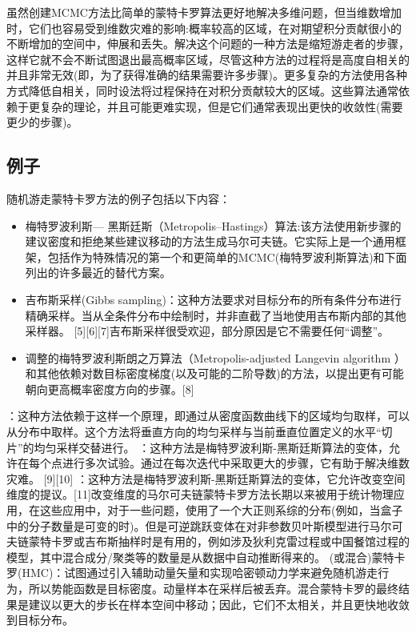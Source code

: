 虽然创建MCMC方法比简单的蒙特卡罗算法更好地解决多维问题，但当维数增加时，它们也容易受到维数灾难的影响:概率较高的区域，在对期望积分贡献很小的不断增加的空间中，伸展和丢失。解决这个问题的一种方法是缩短游走者的步骤，这样它就不会不断试图退出最高概率区域，尽管这种方法的过程将是高度自相关的并且非常无效(即，为了获得准确的结果需要许多步骤)。更多复杂的方法使用各种方式降低自相关，同时设法将过程保持在对积分贡献较大的区域。这些算法通常依赖于更复杂的理论，并且可能更难实现，但是它们通常表现出更快的收敛性(需要更少的步骤)。

\subsection{例子}

随机游走蒙特卡罗方法的例子包括以下内容：

\begin{itemize}
\item 梅特罗波利斯— 黑斯廷斯（Metropolis–Hastings）算法:该方法使用新步骤的建议密度和拒绝某些建议移动的方法生成马尔可夫链。它实际上是一个通用框架，包括作为特殊情况的第一个和更简单的MCMC(梅特罗波利斯算法)和下面列出的许多最近的替代方案。
\item 吉布斯采样(Gibbs sampling)：这种方法要求对目标分布的所有条件分布进行精确采样。当从全条件分布中绘制时，并非直截了当地使用吉布斯内部的其他采样器。 [5][6][7]吉布斯采样很受欢迎，部分原因是它不需要任何“调整”。
\item 调整的梅特罗波利斯朗之万算法（Metropolis-adjusted Langevin algorithm ）和其他依赖对数目标密度梯度(以及可能的二阶导数)的方法，以提出更有可能朝向更高概率密度方向的步骤。[8]
\end{itemize}

\begin{itemize}
：这种方法依赖于这样一个原理，即通过从密度函数曲线下的区域均匀取样，可以从分布中取样。这个方法将垂直方向的均匀采样与当前垂直位置定义的水平“切片”的均匀采样交替进行。
：这种方法是梅特罗波利斯-黑斯廷斯算法的变体，允许在每个点进行多次试验。通过在每次迭代中采取更大的步骤，它有助于解决维数灾难。 [9][10]
：这种方法是梅特罗波利斯-黑斯廷斯算法的变体，它允许改变空间维度的提议。[11]改变维度的马尔可夫链蒙特卡罗方法长期以来被用于统计物理应用，在这些应用中，对于一些问题，使用了一个大正则系综的分布(例如，当盒子中的分子数量是可变的时)。但是可逆跳跃变体在对非参数贝叶斯模型进行马尔可夫链蒙特卡罗或吉布斯抽样时是有用的，例如涉及狄利克雷过程或中国餐馆过程的模型，其中混合成分/聚类等的数量是从数据中自动推断得来的。
(或混合)蒙特卡罗(HMC)：试图通过引入辅助动量矢量和实现哈密顿动力学来避免随机游走行为，所以势能函数是目标密度。动量样本在采样后被丢弃。混合蒙特卡罗的最终结果是建议以更大的步长在样本空间中移动；因此，它们不太相关，并且更快地收敛到目标分布。
\end{itemize}


